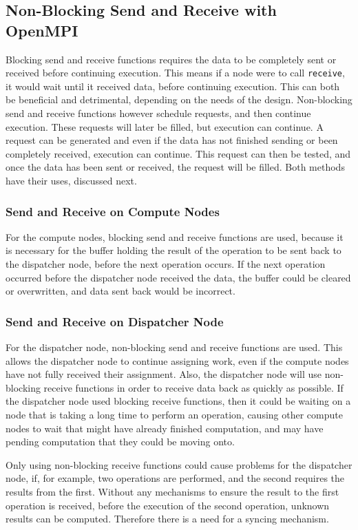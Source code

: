 \subsection{Non-Blocking Send and Receive with OpenMPI}
Blocking send and receive functions requires the data to be completely sent or received before continuing execution. This means if a node were to call \verb|receive|, it would wait until it received data, before continuing execution. This can both be beneficial and detrimental, depending on the needs of the design. Non-blocking send and receive functions however schedule requests, and then continue execution. These requests will later be filled, but execution can continue. A request can be generated and even if the data has not finished sending or been completely received, execution can continue. This request can then be tested, and once the data has been sent or received, the request will be filled. Both methods have their uses, discussed next.

\subsubsection{Send and Receive on Compute Nodes}
For the compute nodes, blocking send and receive functions are used, because it is necessary for the buffer holding the result of the operation to be sent back to the dispatcher node, before the next operation occurs. If the next operation occurred before the dispatcher node received the data, the buffer could be cleared or overwritten, and data sent back would be incorrect.

\subsubsection{Send and Receive on Dispatcher Node}
For the dispatcher node, non-blocking send and receive functions are used. This allows the dispatcher node to continue assigning work, even if the compute nodes have not fully received their assignment. Also, the dispatcher node will use non-blocking receive functions in order to receive data back as quickly as possible. If the dispatcher node used blocking receive functions, then it could be waiting on a node that is taking a long time to perform an operation, causing other compute nodes to wait that might have already finished computation, and may have pending computation that they could be moving onto. 

Only using non-blocking receive functions could cause problems for the dispatcher node, if, for example, two operations are performed, and the second requires the results from the first. Without any mechanisms to ensure the result to the first operation is received, before the execution of the second operation, unknown results can be computed. Therefore there is a need for a syncing mechanism.

